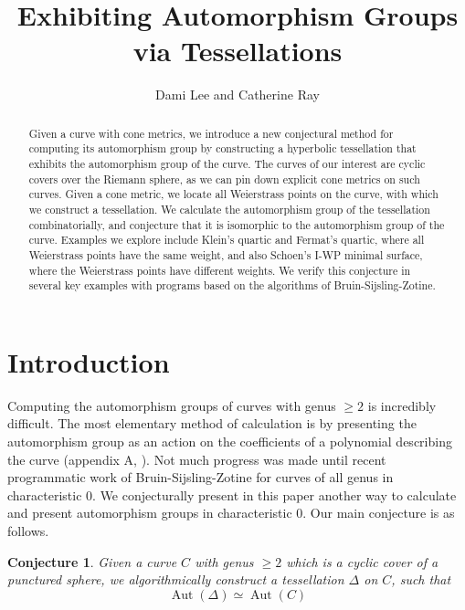 \documentclass[12pt,reqno]{amsart}
\title{Exhibiting Automorphism Groups via Tessellations}
\author{Dami Lee and Catherine Ray}
\DeclareMathOperator{\Aut}{Aut}
\newtheorem{conjecture}[theorem]{Conjecture}
\theoremstyle{definition}
\theoremstyle{remark}
\begin{document}
	
\maketitle

\begin{abstract}
Given a curve with cone metrics, we introduce a new conjectural method for computing its automorphism group by constructing a hyperbolic tessellation that exhibits the automorphism group of the curve. The curves of our interest are cyclic covers over the Riemann sphere, as we can pin down explicit cone metrics on such curves. Given a cone metric, we locate all Weierstrass points on the curve, with which we construct a tessellation. We calculate the automorphism group of the tessellation combinatorially, and conjecture that it is isomorphic to the automorphism group of the curve. Examples we explore include Klein's quartic and Fermat's quartic, where all Weierstrass points have the same weight, and also Schoen's I-WP minimal surface, where the Weierstrass points have different weights. We verify this conjecture in several key examples with programs based on the algorithms of Bruin-Sijsling-Zotine.
\end{abstract}



\section{Introduction}

Computing the automorphism groups of curves with genus $\geq 2$ is incredibly difficult. The most elementary method of calculation is by presenting the automorphism group as an action on the coefficients of a polynomial describing the curve (appendix A, \cite{silverman}). Not much progress was made until recent programmatic work of Bruin-Sijsling-Zotine \cite{jeroen} for curves of all genus in characteristic 0. We conjecturally present in this paper another way to calculate and present automorphism groups in characteristic 0. Our main conjecture is as follows.


\begin{conjecture} Given a curve $C$ with genus $\geq 2$ which is a cyclic cover of a punctured sphere, we algorithmically construct a tessellation $\Delta$ on $C$, such that $$\Aut(\Delta) \simeq \Aut(C)$$  
\end{conjecture}
\end{document}
